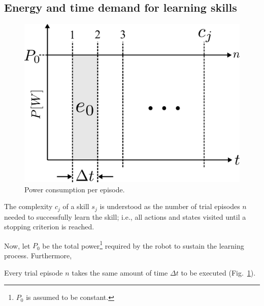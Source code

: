 \subsection{Energy and time demand for learning skills}
\begin{figure}[!ht]
	\centering
	\includegraphics[width=0.9\columnwidth]{fig/power_per_episode.pdf}
	\caption{Power consumption per episode.}
	\label{fig:power_per_episode}
\end{figure}
\begin{tcolorbox}
\begin{definition}\label{definition:complexity} The complexity $c_j$ of a skill $ s_j $  is understood as the number of trial episodes $n$ needed to successfully learn the skill; i.e., all actions and states visited until a stopping criterion is reached. 
\end{definition}
\end{tcolorbox}
Now, let $P_0$ be the total power\footnote{$P_0$ is assumed to be constant.} required by the robot to sustain the learning process. Furthermore,
\begin{tcolorbox}
\begin{assumption}\label{assumption:time} Every trial episode $n$ takes the same amount of time $\Delta t$ to be executed (Fig.~\ref{fig:power_per_episode}).
\end{assumption}
\end{tcolorbox}
